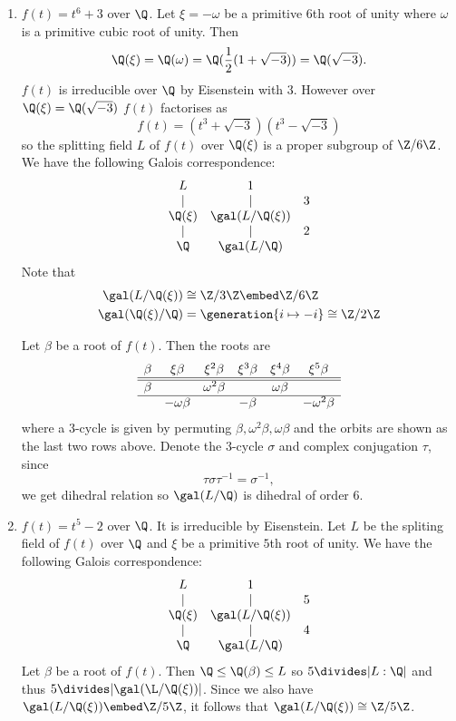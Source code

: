\documentclass[a4paper]{article}
\begin{document}
\begin{eg}\leavevmode
  \begin{enumerate}
  \item \(f(t) = t^6 + 3\) over \(\Q\). Let \(\xi = - \omega\) be a primitive \(6\)th root of unity where \(\omega\) is a primitive cubic root of unity. Then
  \[
    \Q(\xi) = \Q(\omega) = \Q(\frac{1}{2}(1 + \sqrt{-3})) = \Q(\sqrt{-3}).
  \]
  \(f(t)\) is irreducible over \(\Q\) by Eisenstein with \(3\). However over \(\Q(\xi) = \Q(\sqrt{-3})\) \(f(t)\) factorises as
  \[
    f(t) = (t^3 + \sqrt{-3}) (t^3 - \sqrt{-3})
  \]
  so the splitting field \(L\) of \(f(t)\) over \(\Q(\xi)\) is a proper subgroup of \(\Z/6\Z\). We have the following Galois correspondence:
  \[
    \begin{array}[h]{ccc}
      L & 1 & \\
      | & | & 3 \\
      \Q(\xi) & \gal(L/\Q(\xi)) & \\
      | & | & 2 \\
      \Q & \gal(L/\Q) &
    \end{array}
  \]
   Note that
   \begin{align*}
     \gal(L/\Q(\xi)) &\cong \Z/3\Z \embed \Z/6\Z \\
     \gal(\Q(\xi)/\Q) &= \generation{i \mapsto -i} \cong \Z/2\Z
   \end{align*}

   Let \(\beta\) be a root of \(f(t)\). Then the roots are
   \[
     \begin{array}[h]{cccccc}
       \beta & \xi \beta & \xi^2 \beta & \xi^3 \beta & \xi^4 \beta & \xi^5 \beta \\ \hline \hline
       \beta & & \omega^2 \beta & & \omega\beta & \\ \hline
       & - \omega \beta & & - \beta & & - \omega^2 \beta
     \end{array}
   \]
   where a \(3\)-cycle is given by permuting \(\beta, \omega^2 \beta, \omega \beta\) and the orbits are shown as the last two rows above. Denote the \(3\)-cycle \(\sigma\) and complex conjugation \(\tau\), since
   \[
     \tau \sigma \tau^{-1} = \sigma^{-1},
   \]
   we get dihedral relation so \(\gal(L/\Q)\) is dihedral of order \(6\).
 \item \(f(t) = t^5 - 2\) over \(\Q\). It is irreducible by Eisenstein. Let \(L\) be the spliting field of \(f(t)\) over \(\Q\) and \(\xi\) be a primitive \(5\)th root of unity. We have the following Galois correspondence:
   \[
     \begin{array}[h]{ccc}
       L & 1 & \\
       | & | & 5 \\
       \Q(\xi) & \gal(L/\Q(\xi)) & \\
       | & | & 4 \\
       \Q & \gal(L/\Q)
     \end{array}
   \]
   Let \(\beta\) be a root of \(f(t)\). Then \(\Q \leq \Q(\beta) \leq L\) so \(5 \divides |L:\Q|\) and thus \(5 \divides |\gal(\L/\Q(\xi))|\). Since we also have \(\gal(L/\Q(\xi)) \embed \Z/5\Z\), it follows that \(\gal(L/\Q(\xi)) \cong \Z/5\Z\).


\end{enumerate}
\end{eg}
\end{document}
